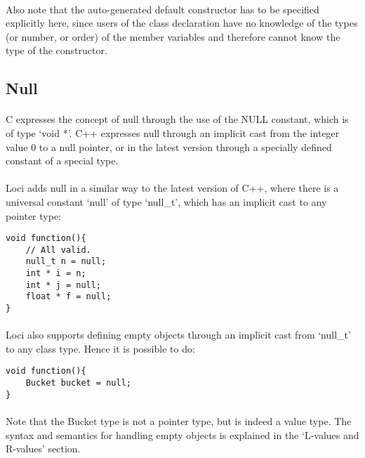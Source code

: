 \documentclass[12pt,twoside,notitlepage]{report}
\begin{document}
\paragraph{}
Also note that the auto-generated default constructor has to be specified explicitly here, since users of the class declaration have no knowledge of the types (or number, or order) of the member variables and therefore cannot know the type of the constructor.

\clearpage

\subsection{Null}

\paragraph{}
C expresses the concept of null through the use of the NULL constant, which is of type `void *'. C++ expresses null through an implicit cast from the integer value 0 to a null pointer, or in the latest version through a specially defined constant of a special type.

\paragraph{}
Loci adds null in a similar way to the latest version of C++, where there is a universal constant `null' of type `null\_t', which has an implicit cast to any pointer type:


\begin{lstlisting}
void function(){
	// All valid.
	null_t n = null;
	int * i = n;
	int * j = null;
	float * f = null;
}
\end{lstlisting}


\paragraph{}
Loci also supports defining empty objects through an implicit cast from `null\_t' to any class type. Hence it is possible to do:


\begin{lstlisting}
void function(){
	Bucket bucket = null;
}
\end{lstlisting}


\paragraph{}
Note that the Bucket type is not a pointer type, but is indeed a value type. The syntax and semantics for handling empty objects is explained in the `L-values and R-values' section.
\end{document}
